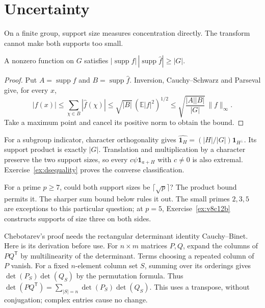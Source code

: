 \section{Uncertainty}

On a finite group, support size measures concentration directly. The transform cannot make both supports too small.

\begin{theorem}\label{thm:donohostark}
A nonzero function on $G$ satisfies
$|\operatorname{supp}f|\,|\operatorname{supp}\hat f|\ge|G|$.
\end{theorem}
\begin{proof}
Put $A=\operatorname{supp}f$ and $B=\operatorname{supp}\hat f$. Inversion, Cauchy--Schwarz and Parseval give, for every $x$,
\[
|f(x)|\le\sum_{\chi\in B}|\hat f(\chi)|
\le\sqrt{|B|}\,(\mathbb E|f|^2)^{1/2}
\le\sqrt{\frac{|A||B|}{|G|}}\,\|f\|_\infty.
\]
Take a maximum point and cancel its positive norm to obtain the bound.
\end{proof}

For a subgroup indicator, character orthogonality gives $\widehat{\mathbf1_H}=(|H|/|G|)\mathbf1_{H^\perp}$. Its support product is exactly $|G|$. Translation and multiplication by a character preserve the two support sizes, so every $c\psi\mathbf1_{a+H}$ with $c\ne0$ is also extremal. Exercise~\ref{ex:dsequality} proves the converse classification.

\begin{think}
For a prime $p\ge7$, could both support sizes be $\lceil\sqrt p\rceil$? The product bound permits it. The sharper sum bound below rules it out. The small primes $2,3,5$ are exceptions to this particular question; at $p=5$, Exercise~\ref{ex:v8c12b} constructs supports of size three on both sides.
\end{think}

Chebotarev's proof needs the rectangular determinant identity Cauchy--Binet. Here is its derivation before use. For $n\times m$ matrices $P,Q$, expand the columns of $PQ^{\mathsf T}$ by multilinearity of the determinant. Terms choosing a repeated column of $P$ vanish. For a fixed $n$-element column set $S$, summing over its orderings gives $\det(P_S)\det(Q_S)$ by the permutation formula. Thus $\det(PQ^{\mathsf T})=\sum_{|S|=n}\det(P_S)\det(Q_S)$. This uses a transpose, without conjugation; complex entries cause no change.

